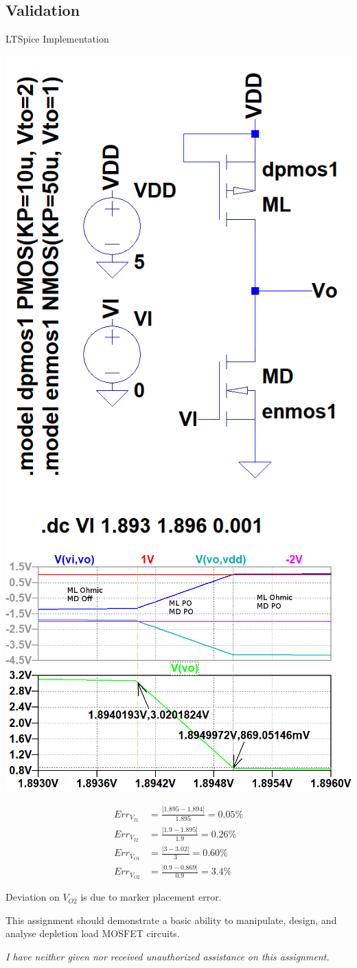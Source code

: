 \documentclass[12pt,letterpaper,titlepage]{article}
\begin{document}
\begin{raggedright}
\subsection{Validation}

\begin{center}
LTSpice Implementation
\begin{paracol}{2}
\includegraphics[width=.31\textwidth, height=\textheight, keepaspectratio=true]{ds1b}
\switchcolumn
\includegraphics[width=.62\textwidth, height=\textheight, keepaspectratio=true]{ds1c}
\end{paracol}
\begin{align*}
   Err_{V_{I1}} &= \frac{|1.895 - 1.894|}{1.895} = 0.05\%
\\ Err_{V_{I2}} &= \frac{|1.9 - 1.895|}{1.9} = 0.26\%
\\ Err_{V_{O1}} &= \frac{|3 - 3.02|}{3} = 0.60\%
\\ Err_{V_{O2}} &= \frac{|0.9 - 0.869|}{0.9} = 3.4\%
\end{align*}

Deviation on $V_{O2}$ is due to marker placement error.

\end{center}


This assignment should demonstrate a basic ability to manipulate, design, and analyse depletion load MOSFET circuits.

\textit{I have neither given nor received unauthorized assistance on this assignment.}


\end{raggedright}
\end{document}

